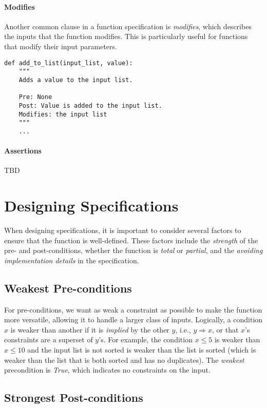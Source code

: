 \documentclass[oneside,11pt,dvipsnames]{book}
\renewcommand{\implies}{\Rightarrow}
\begin{document}
\paragraph{Modifies} Another common clause in a function specification is \emph{modifies}, which describes the inputs that the function modifies. This is particularly useful for functions that modify their input parameters.

\begin{lstlisting}
def add_to_list(input_list, value):
    """
    Adds a value to the input list.

    Pre: None
    Post: Value is added to the input list.
    Modifies: the input list
    """
    ...
\end{lstlisting}


\paragraph{Assertions} TBD

\section{Designing Specifications}\label{sec:design-specifications}

When designing specifications, it is important to consider several factors to ensure that the function is well-defined. These factors include the \emph{strength} of the pre- and post-conditions, whether the function is \emph{total} or \emph{partial}, and the \emph{avoiding implementation details} in the specification.

\subsection{Weakest Pre-conditions}\label{sec:weakest-preconditions}
For pre-conditions, we want as weak a constraint as possible to make the function more versatile, allowing it to handle a larger class of inputs.
Logically, a condition $x$ is weaker than another if it is \emph{implied} by the other $y$, i.e.,  $y \implies x$, or that $x$'s constraints are a superset of $y$'s. For example, the condition $x \le 5$ is weaker than $x \le 10$ and the input list is not sorted is weaker than the list is sorted (which is weaker than the list that is both sorted and has no duplicates).
The \emph{weakest} precondition is \emph{True}, which indicates no constraints on the input.


\subsection{Strongest Post-conditions}\label{sec:strongest-postconditions}
\end{document}
